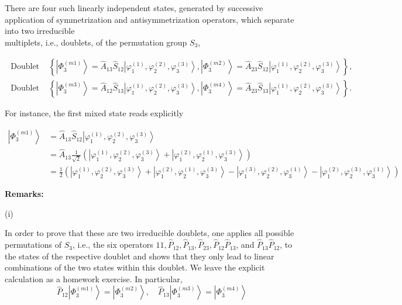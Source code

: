 \documentclass[10pt, letterpaper]{article}
\begin{document}
There are four such linearly independent states, generated by successive application of symmetrization and antisymmetrization operators, which separate into two irreducible\\
multiplets, i.e., doublets, of the permutation group $S_{3}$,

$$
\begin{array}{ll}
\text { Doublet 1: } & \left\{\left|\Phi_{3}^{(m 1)}\right\rangle=\hat{A}_{13} \hat{S}_{12}\left|\varphi_{1}^{(1)}, \varphi_{2}^{(2)}, \varphi_{3}^{(3)}\right\rangle,\left|\Phi_{3}^{(m 2)}\right\rangle=\hat{A}_{23} \hat{S}_{12}\left|\varphi_{1}^{(1)}, \varphi_{2}^{(2)}, \varphi_{3}^{(3)}\right\rangle\right\}, \\
\text { Doublet 2: } & \left\{\left|\Phi_{3}^{(m 3)}\right\rangle=\hat{A}_{12} \hat{S}_{13}\left|\varphi_{1}^{(1)}, \varphi_{2}^{(2)}, \varphi_{3}^{(3)}\right\rangle,\left|\Phi_{3}^{(m 4)}\right\rangle=\hat{A}_{23} \hat{S}_{13}\left|\varphi_{1}^{(1)}, \varphi_{2}^{(2)}, \varphi_{3}^{(3)}\right\rangle\right\} .
\end{array}
$$

For instance, the first mixed state reads explicitly

$$
\begin{aligned}
\left|\Phi_{3}^{(m 1)}\right\rangle & =\hat{A}_{13} \hat{S}_{12}\left|\varphi_{1}^{(1)}, \varphi_{2}^{(2)}, \varphi_{3}^{(3)}\right\rangle \\
& =\hat{A}_{13} \frac{1}{\sqrt{2}}\left(\left|\varphi_{1}^{(1)}, \varphi_{2}^{(2)}, \varphi_{3}^{(3)}\right\rangle+\left|\varphi_{1}^{(2)}, \varphi_{2}^{(1)}, \varphi_{3}^{(3)}\right\rangle\right) \\
& =\frac{1}{2}\left(\left|\varphi_{1}^{(1)}, \varphi_{2}^{(2)}, \varphi_{3}^{(3)}\right\rangle+\left|\varphi_{1}^{(2)}, \varphi_{2}^{(1)}, \varphi_{3}^{(3)}\right\rangle-\left|\varphi_{1}^{(3)}, \varphi_{2}^{(2)}, \varphi_{3}^{(1)}\right\rangle-\left|\varphi_{1}^{(2)}, \varphi_{2}^{(3)}, \varphi_{3}^{(1)}\right\rangle\right)
\end{aligned}
$$

\textbf{Remarks:}


(i) 

In order to prove that these are two irreducible doublets, one applies all possible permutations of $S_{3}$, i.e., the six operators $11, \hat{P}_{12}, \hat{P}_{13}, \hat{P}_{23}, \hat{P}_{12} \hat{P}_{13}$, and $\hat{P}_{13} \hat{P}_{12}$, to the states of the respective doublet and shows that they only lead to linear combinations of the two states within this doublet. We leave the explicit calculation as a homework exercise. In particular,
$$
\hat{P}_{12}\left|\Phi_{3}^{(m 1)}\right\rangle=\left|\Phi_{3}^{(m 2)}\right\rangle, \quad \hat{P}_{13}\left|\Phi_{3}^{(m 3)}\right\rangle=\left|\Phi_{3}^{(m 4)}\right\rangle
$$
\end{document}
